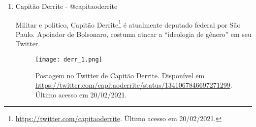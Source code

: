 \documentclass[
	12pt,				%
	openright,			%
	twoside,			%
	a4paper,			%
	english,			%
	brazil				%
	]{abntex2}
\begin{document}
\begin{anexosenv}
\begin{enumerate}
  Bruno Engler\footnote{\url{https://twitter.com/BrunoEnglerDM}. Último acesso em 20/02/2021.} é político e coordenador das redes sociais do Movimento Direita Minas (ver \ref{dirmin}). Atualmente exerce o cargo de deputado estadual por Minas Gerais. Ligado ao governo Bolsonaro, o deputado em várias postagens critica o movimento feminista e a ``ideologia de gênero'' e se posiciona contra a descriminalização do aborto.
 
 \begin{figure}[!htbp]
    \centering
    \texttt{[image: brunoe\_1.png]}
    \caption{Postagem no Twitter de Bruno Engler. Disponível em \url{https://twitter.com/BrunoEnglerDM/status/1311013791228887043}. Último acesso em 20/02/2021.}
 \end{figure}
 
 
 
 \newpage
 
  \item Capitão Derrite - @capitaoderrite
  
  Militar e político, Capitão Derrite\footnote{\url{https://twitter.com/capitaoderrite}. Último acesso em 20/02/2021.} é atualmente deputado federal por São Paulo. Apoiador de Bolsonaro, costuma atacar a ``ideologia de gênero'' em seu Twitter.
 
 \begin{figure}[!htbp]
    \centering
    \texttt{[image: derr\_1.png]}
    \caption{Postagem no Twitter de Capitão Derrite. Disponível em \url{https://twitter.com/capitaoderrite/status/1341067846697271299}. Último acesso em 20/02/2021.}
 \end{figure}
 
 

\end{enumerate}
\end{anexosenv}
\end{document}
